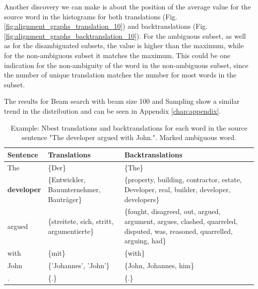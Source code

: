 Another discovery we can make is about the position of the average value for the source word in the histograms for both translations (Fig. \ref{fig:alignment_graphs_translation_10}) and backtranslations (Fig. \ref{fig:alignment_graphs_backtranslation_10}). For the ambiguous subset, as well as for the disambiguated subsets, the value is higher than the maximum, while for the non-ambiguous subset it matches the maximum. This could be one indication for the non-ambiguity of the word in the non-ambiguous subset, since the number of unique translation matches the number for most words in the subset. 

The results for Beam search with beam size 100 and Sampling show a similar trend in the distribution and can be seen in Appendix \ref{chap:appendix}.

\begin{table}[!htb]
    \centering
    \begin{tabularx}{\textwidth}{|l|X|X|}
        \hline
        \textbf{Sentence}  & \textbf{Translations} & \textbf{Backtranslations} \\ \hline
        The & \{Der\} & \{The\} \\ 
        \textbf{developer} & \{Entwickler, Bauunternehmer, Bauträger\} & \{property, building, contractor, estate, Developer, real, builder, developer, developers\} \\ 
        argued & \{streitete, sich, stritt, argumentierte\} & \{fought, disagreed, out, argued, argument, argues, clashed, quarreled, disputed, was, reasoned, quarrelled, arguing, had\} \\ 
        with & \{mit\} & \{with\} \\ 
        John & \{'Johannes', 'John'\} & \{John, Johannes, him\} \\ 
        . & \{.\} & \{.\} \\ \hline
    \end{tabularx}
    \caption{Example: Nbest translations and backtranslations for each word in the source sentence "The developer argued with John.". Marked ambiguous word.}
    \label{tab:alignment_example}
\end{table}

